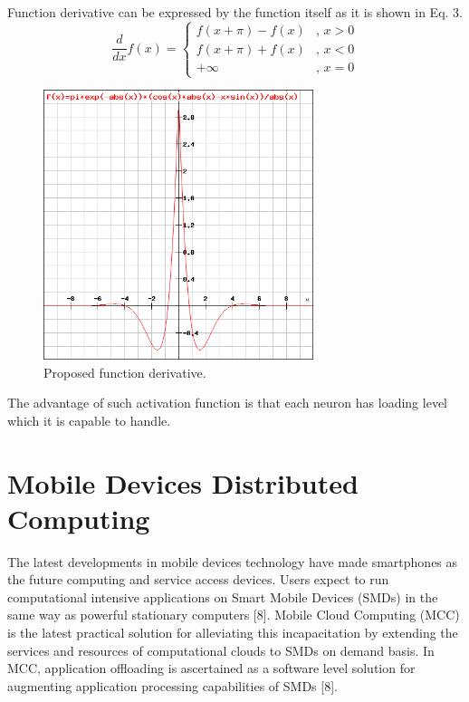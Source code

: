 \documentclass{llncs}
\begin{document}
Function derivative can be expressed by the function itself as it is shown in Eq. 3.
%
\begin{equation}
\frac{d}{dx}f(x) = 
\left\{
	\begin{array}{ll}
		f(x + \pi) - f(x) & \mbox{, } x > 0 \\
		f(x + \pi) + f(x) & \mbox{, } x < 0 \\
		+\infty & \mbox{, } x = 0
	\end{array}
\right.
\end{equation}
%
\begin{figure}
	\centering
	\includegraphics[width=7.88cm,height=7.88cm]{fig04.png}
	\caption{Proposed function derivative.}
	\label{fig:Graph}
\end{figure}
\FloatBarrier
%
The advantage of such activation function is that each neuron has loading level which it is capable to handle. 
%
\section{Mobile Devices Distributed Computing}
%
The latest developments in mobile devices technology have made smartphones as the future computing and service access devices. Users expect to run computational intensive applications on Smart Mobile Devices (SMDs) in the same way as powerful stationary computers [8]. Mobile Cloud Computing (MCC) is the latest practical solution for alleviating this incapacitation by extending the services and resources of computational clouds to SMDs on demand basis. In MCC, application offloading is ascertained as a software level solution for augmenting application processing capabilities of SMDs [8]. 
\end{document}
